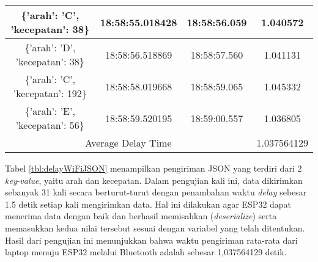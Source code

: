 \begin{longtable}{|ccc|c|}
    \multicolumn{1}{|c|}{\{'arah': 'C', 'kecepatan': 38\}}  & \multicolumn{1}{c|}{18:58:55.018428} & 18:58:56.059       & 1.040572    \\ \hline
    \multicolumn{1}{|c|}{\{'arah': 'D', 'kecepatan': 38\}}  & \multicolumn{1}{c|}{18:58:56.518869} & 18:58:57.560       & 1.041131    \\ \hline
    \multicolumn{1}{|c|}{\{'arah': 'C', 'kecepatan': 192\}} & \multicolumn{1}{c|}{18:58:58.019668} & 18:58:59.065       & 1.045332    \\ \hline
    \multicolumn{1}{|c|}{\{'arah': 'E', 'kecepatan': 56\}}  & \multicolumn{1}{c|}{18:58:59.520195} & 18:59:00.557       & 1.036805    \\ \hline
    \multicolumn{3}{|c|}{Average Delay Time}                                                                            & 1.037564129 \\ \hline
\end{longtable}

Tabel \ref{tbl:delayWiFiJSON} menampilkan pengiriman JSON yang terdiri dari 2 \emph{key}-\emph{value}, yaitu arah dan kecepatan. Dalam pengujian kali ini, data dikirimkan sebanyak 31 kali secara berturut-turut dengan penambahan waktu \emph{delay} sebesar 1.5 detik setiap kali mengirimkan data. Hal ini dilakukan agar ESP32 dapat menerima data dengan baik dan berhasil memisahkan (\emph{deserialize}) serta memasukkan kedua nilai tersebut sesuai dengan variabel yang telah ditentukan. Hasil dari pengujian ini menunjukkan bahwa waktu pengiriman rata-rata dari laptop menuju ESP32 melalui Bluetooth adalah sebesar 1,037564129 detik.


